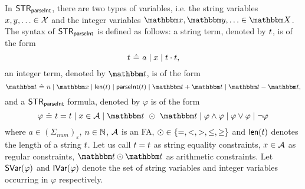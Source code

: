 

In ${\sf STR}_{\textsf{parseInt}}$, there are two types of variables, i.e. the string variables $x,y,\ldots \in \mathcal{X}$ and the integer variables $\ivarx,\ivary,\ldots \in \ivars$.
The syntax of ${\sf STR}_{\textsf{parseInt}}$ is defined as follows:
a string term, denoted by $t$, is of the form 
$$t\  \hat{=}\  a \mid x \mid t \cdot t,$$
an integer term, denoted by $\iterm$, is of the form
$$\iterm\  \Def\  n \mid \ivarx \mid \len(\sterm) \mid \parseInt(\sterm) \mid \iterm + \iterm \mid \iterm - \iterm,$$
and a ${\sf STR}_{\textsf{parseInt}}$ formula, denoted by $\varphi$ is of the form 
$$\varphi\ \Def\ \sterm = \sterm \mid x \in \Aut \mid \iterm\ \op\ \iterm \mid \varphi \wedge \varphi \mid \varphi \vee \varphi \mid \neg \varphi$$
where $a \in (\Sigma_{\textit{num}})_\varepsilon$, $n \in \mathbb{N}$, $\mathcal{A}$ is an FA, $\odot \in \{=, < , >, \le, \ge\}$ and $\textsf{len}(t)$ denotes the length of a string $t$. 
Let us call $t = t$ as string equality constraints, $x \in \mathcal{A}$ as regular constraints, $\iterm \op \iterm$ as arithmetic constraints. 
Let  $\textsf{SVar}(\varphi)$ and $\textsf{IVar}(\varphi)$ denote the set of string variables and integer variables occurring in $\varphi$ respectively.

